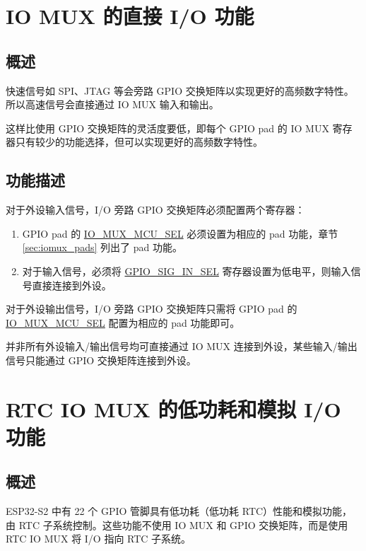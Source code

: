 \documentclass[main\_\_CN.tex]{subfiles}
\begin{document}
\section{IO MUX 的直接 I/O 功能}

\subsection{概述}

快速信号如 SPI、JTAG 等会旁路 GPIO 交换矩阵以实现更好的高频数字特性。所以高速信号会直接通过 IO MUX 输入和输出。

这样比使用 GPIO 交换矩阵的灵活度要低，即每个 GPIO pad 的 IO MUX 寄存器只有较少的功能选择，但可以实现更好的高频数字特性。

\subsection{功能描述}

对于外设输入信号，I/O 旁路 GPIO 交换矩阵必须配置两个寄存器：

\begin{enumerate}
\item GPIO pad 的 \hyperref[fielddesc:IOMUXMCUSEL]{IO\_MUX\_MCU\_SEL} 必须设置为相应的 pad 功能，章节 \ref{sec:iomux_pads} 列出了 pad 功能。
\item 对于输入信号，必须将 \hyperref[fielddesc:GPIOSIGNINSEL]{GPIO\_SIG\_IN\_SEL} 寄存器设置为低电平，则输入信号直接连接到外设。
\end{enumerate}

对于外设输出信号，I/O 旁路 GPIO 交换矩阵只需将 GPIO pad 的 \hyperref[fielddesc:IOMUXMCUSEL]{IO\_MUX\_MCU\_SEL} 配置为相应的 pad 功能即可。

\begin{tiplisting}
并非所有外设输入/输出信号均可直接通过 IO MUX 连接到外设，某些输入/输出信号只能通过 GPIO 交换矩阵连接到外设。
\end{tiplisting}

\section{RTC IO MUX 的低功耗和模拟 I/O 功能}

\subsection{概述}

ESP32-S2 中有 22 个 GPIO 管脚具有低功耗（低功耗 RTC）性能和模拟功能，由 RTC 子系统控制。这些功能不使用 IO MUX 和 GPIO 交换矩阵，而是使用 RTC IO MUX 将 I/O 指向 RTC 子系统。
\end{document}
